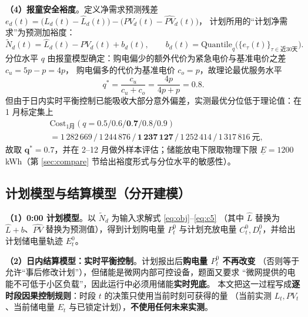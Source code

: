 \textbf{（4\nobreak）报童安全裕度}\nobreak。定义净需求预测残差
$e_d(t)=\big(L_d(t)-\hat L_d(t)\big)-\big(PV_d(t)-\widehat{PV}_d(t)\big)$\nobreak，
计划所用的“计划净需求\nobreak”为预测加裕度\nobreak：
\begin{equation}
\tilde N_d(t)=\hat L_d(t)-\widehat{PV}_d(t)+b_d(t),\qquad
b_d(t)=\mathrm{Quantile}_{q}\big(\{e_\tau(t)\}_{\tau\in\text{近30天}}\big).
\label{eq:buffer}
\end{equation}
分位水平 $q$ 由报童模型\cite{newsboy}确定\nobreak：购电偏少的额外代价为紧急电价与基准电价之差 $c_u=5p-p=4p$\nobreak，
购电偏多的代价为基准电价 $c_o=p$\nobreak，故理论最优服务水平
\begin{equation}
q^*=\frac{c_u}{c_u+c_o}=\frac{4p}{4p+p}=0.8 .
\label{eq:newsboy}
\end{equation}
但由于日内实时平衡控制已能吸收大部分意外偏差\nobreak，实测最优分位低于理论值\nobreak：在 1 月标定集上
\begin{equation}
\begin{aligned}
&\mathrm{Cost}_{1\text{月}}(q=0.5/0.6/\textbf{0.7}/0.8/0.9)\\
&=1\,282\,669\,/\,1\,244\,876\,/\,\bm{1\,237\,127}\,/\,1\,252\,414\,/\,1\,317\,816\ \text{元},
\end{aligned}
\label{eq:qtune}
\end{equation}
故取 $\bm{q^*=0.7}$\nobreak，并在 2--12 月做外样本评估\nobreak；储能放电下限取物理下限
$\underline E=1200$ kWh（第 \ref{sec:compare} 节给出裕度形式与分位水平的敏感性\nobreak）\nobreak。

\subsection{计划模型与结算模型（分开建模\nobreak）}

\textbf{（1\nobreak）0:00 计划模型}\nobreak。以 $\tilde N_d$ 为输入求解式 \eqref{eq:obj}--\eqref{eq:c5}
（其中 $\hat L$ 替换为 $\hat L+b$\nobreak、$\widehat{PV}$ 替换为预测值\nobreak）\nobreak，得到计划购电量 $P^0_t$
与计划充放电量 $C^0_t,D^0_t$\nobreak，并给出计划储电量轨迹 $E^0_t$\nobreak。

\textbf{（2\nobreak）日内结算模型\nobreak：实时平衡控制}\nobreak。计划报出后\textbf{购电量 $P^0_t$ 不再改变}
（否则等于允许“事后修改计划\nobreak”\nobreak）\nobreak，但储能是微网内部可控设备\nobreak，题面又要求
“微网提供的电能不可低于小区负载\nobreak”\nobreak，因此运行中必须用储能\textbf{实时兜底}\nobreak。
本文把这一过程写成\textbf{逐时段因果控制规则}\nobreak：时段 $t$ 的决策只使用当前时刻可获得的量
（当前实测 $L_t,PV_t$\nobreak、当前储电量 $E_t$ 与已锁定计划\nobreak）\nobreak，\textbf{不使用任何未来实测}\nobreak。

